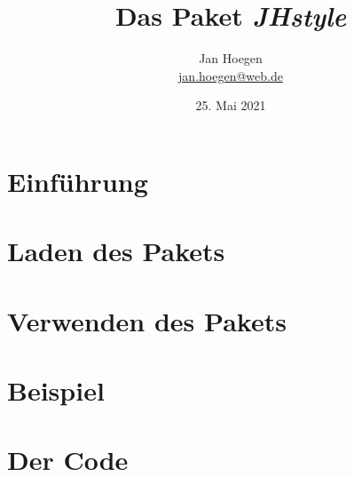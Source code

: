 \documentclass[%
	fontsize=10pt, 
	DIV=8, 
]{scrartcl}
\title{Das Paket \textit{JHstyle}}
\author{Jan Hoegen\\\href{mailto:jan.hoegen@web.de}{jan.hoegen@web.de}}
\date{25. Mai 2021}
\begin{document}
\maketitle

\section{Einführung}

\section{Laden des Pakets}

\section{Verwenden des Pakets}

\section{Beispiel}

\section{Der Code}
\end{document}

